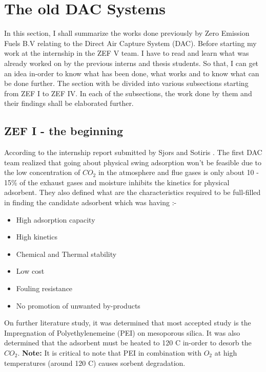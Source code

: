 \section{The old DAC Systems}
\label{sec:prework}

In this section, I shall summarize the works done previously by Zero Emission Fuels B.V relating to the Direct Air Capture System (DAC). Before starting my work at the internship in the ZEF V team. I have to read and learn what was already worked on by the previous interns and thesis students. So that, I can get an idea in-order to know what has been done, what works and to know what can be done further. The section with be divided into various subsections starting from ZEF I to ZEF IV. In each of the subsections, the work done by them and their findings shall be elaborated further. 

\subsection{ZEF I - the beginning}

According to the internship report submitted by Sjors and Sotiris \cite{Wagenaar2018}. The first DAC team realized that going about physical swing adsorption won't be feasible due to the low concentration of $CO_2$ in the atmosphere and flue gases is only about 10 - 15\% of the exhaust gases and moisture inhibits the kinetics for physical adsorbent. They also defined what are the characteristics required to be full-filled in finding the candidate adsorbent which was having :-

\begin{itemize}
    \item High adsorption capacity
    \item High kinetics 
    \item Chemical and Thermal stability
    \item Low cost 
    \item Fouling resistance 
    \item No promotion of unwanted by-products
\end{itemize}

On further literature study, it was determined that most accepted study is the Impregnation of Polyethylenemeine (PEI) on mesoporous silica. It was also determined that the adsorbent must be heated to 120 \degree C  in-order to desorb the $CO_2$. \textbf{Note:} It is critical to note that PEI in combination with $O_2$ at high temperatures (around 120 \degree C) causes sorbent degradation. 

